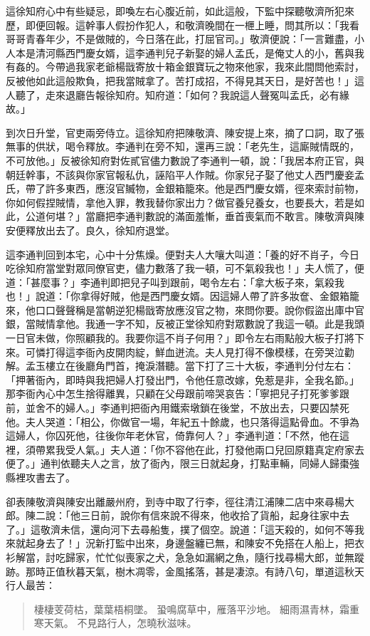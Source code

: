 這徐知府心中有些疑忌，即喚左右心腹近前，如此這般，下監中探聽敬濟所犯來歷，即便回報。這幹事人假扮作犯人，和敬濟晚間在一㭱上睡，問其所以：「我看哥哥青春年少，不是做賊的，今日落在此，打屈官司。」敬濟便說：「一言難盡，小人本是清河縣西門慶女婿，這李通判兒子新娶的婦人孟氏，是俺丈人的小，舊與我有姦的。今帶過我家老爺楊戩寄放十箱金銀寶玩之物來他家，我來此間問他索討，反被他如此這般欺負，把我當賊拿了。苦打成招，不得見其天日，是好苦也！」這人聽了，走來退廳告報徐知府。知府道：「如何？我說這人聲冤叫孟氏，必有緣故。」

到次日升堂，官吏兩旁侍立。這徐知府把陳敬濟、陳安提上來，摘了口詞，取了張無事的供狀，喝令釋放。李通判在旁不知，還再三說：「老先生，這廝賊情既的，不可放他。」反被徐知府對佐貳官儘力數說了李通判一頓，說：「我居本府正官，與朝廷幹事，不該與你家官報私仇，誣陷平人作賊。你家兒子娶了他丈人西門慶妾孟氏，帶了許多東西，應沒官贓物，金銀箱籠來。他是西門慶女婿，徑來索討前物，你如何假捏賊情，拿他入罪，教我替你家出力？做官養兒養女，也要長大，若是如此，公道何堪？」當廳把李通判數說的滿面羞慚，垂首喪氣而不敢言。陳敬濟與陳安便釋放出去了。良久，徐知府退堂。

這李通判回到本宅，心中十分焦燥。便對夫人大嚷大叫道：「養的好不肖子，今日吃徐知府當堂對眾同僚官吏，儘力數落了我一頓，可不氣殺我也！」夫人慌了，便道：「甚麼事？」李通判即把兒子叫到跟前，喝令左右：「拿大板子來，氣殺我也！」說道：「你拿得好賊，他是西門慶女婿。因這婦人帶了許多妝奩、金銀箱籠來，他口口聲聲稱是當朝逆犯楊戩寄放應沒官之物，來問你要。說你假盜出庫中官銀，當賊情拿他。我通一字不知，反被正堂徐知府對眾數說了我這一頓。此是我頭一日官未做，你照顧我的。我要你這不肖子何用？」即令左右雨點般大板子打將下來。可憐打得這李衙內皮開肉綻，鮮血迸流。夫人見打得不像模樣，在旁哭泣勸解。孟玉樓立在後廳角門首，掩淚潛聽。當下打了三十大板，李通判分付左右：「押著衙內，即時與我把婦人打發出門，令他任意改嫁，免惹是非，全我名節。」那李衙內心中怎生捨得離異，只顧在父母跟前啼哭哀告：「寧把兒子打死爹爹跟前，並舍不的婦人。」李通判把衙內用鐵索墩鎖在後堂，不放出去，只要囚禁死他。夫人哭道：「相公，你做官一場，年紀五十餘歲，也只落得這點骨血。不爭為這婦人，你囚死他，往後你年老休官，倚靠何人？」李通判道：「不然，他在這裡，須帶累我受人氣。」夫人道：「你不容他在此，打發他兩口兒回原籍真定府家去便了。」通判依聽夫人之言，放了衙內，限三日就起身，打點車輛，同婦人歸棗強縣裡攻書去了。

卻表陳敬濟與陳安出離嚴州府，到寺中取了行李，徑往清江浦陳二店中來尋楊大郎。陳二說：「他三日前，說你有信來說不得來，他收拾了貨船，起身往家中去了。」這敬濟未信，還向河下去尋船隻，撲了個空。說道：「這天殺的，如何不等我來就起身去了！」況新打監中出來，身邊盤纏已無，和陳安不免搭在人船上，把衣衫解當，討吃歸家，忙忙似喪家之犬，急急如漏網之魚，隨行找尋楊大郎，並無蹤跡。那時正值秋暮天氣，樹木凋零，金風搖落，甚是凄涼。有詩八句，單道這秋天行人最苦：
\begin{quote}
棲棲芰荷枯，葉葉梧桐墜。
蛩鳴腐草中，雁落平沙地。
細雨濕青林，霜重寒天氣。
不見路行人，怎曉秋滋味。
\end{quote}

